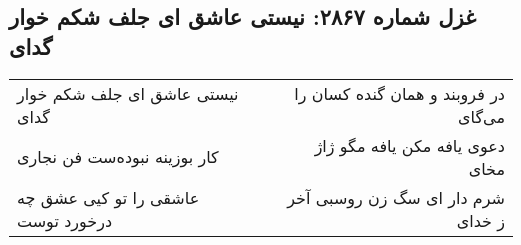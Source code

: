 \begin{center}
\section*{غزل شماره ۲۸۶۷: نیستی عاشق ای جلف شکم خوار گدای}
\label{sec:2867}
\begin{longtable}{l p{0.5cm} r}
نیستی عاشق ای جلف شکم خوار گدای
&&
در فروبند و همان گنده کسان را می‌گای
\\
کار بوزینه نبوده‌ست فن نجاری
&&
دعوی یافه مکن یافه مگو ژاژ مخای
\\
عاشقی را تو کیی عشق چه درخورد توست
&&
شرم دار ای سگ زن روسبی آخر ز خدای
\\
\end{longtable}
\end{center}
